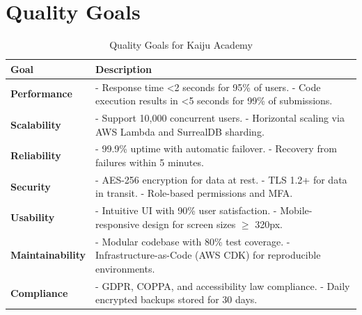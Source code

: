 \documentclass[a4paper, 11pt]{scrreprt}
\begin{document}
\section{Quality Goals}
\begin{table}[htp]
    \centering
    \begin{tabularx}{\textwidth}{|l|X|}
        \hline
        \textbf{Goal} & \textbf{Description} \\
        \hline
        \textbf{Performance} & - Response time <2 seconds for 95\% of users. \newline - Code execution results in <5 seconds for 99\% of submissions. \\
        \hline
        \textbf{Scalability} & - Support 10,000 concurrent users. \newline - Horizontal scaling via AWS Lambda and SurrealDB sharding. \\
        \hline
        \textbf{Reliability} & - 99.9\% uptime with automatic failover. \newline - Recovery from failures within 5 minutes. \\
        \hline
        \textbf{Security} & - AES-256 encryption for data at rest. \newline - TLS 1.2+ for data in transit. \newline - Role-based permissions and MFA. \\
        \hline
        \textbf{Usability} & - Intuitive UI with 90\% user satisfaction. \newline - Mobile-responsive design for screen sizes $\geq$ 320px. \\
        \hline
        \textbf{Maintainability} & - Modular codebase with 80\% test coverage. \newline - Infrastructure-as-Code (AWS CDK) for reproducible environments. \\
        \hline
        \textbf{Compliance} & - GDPR, COPPA, and accessibility law compliance. \newline - Daily encrypted backups stored for 30 days. \\
        \hline
    \end{tabularx}
    \caption{Quality Goals for Kaiju Academy}
\end{table}
\end{document}

